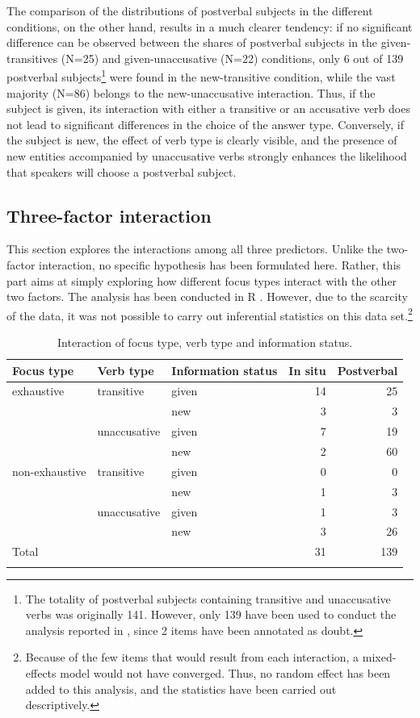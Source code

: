 The comparison of the distributions of postverbal subjects in the different conditions, on the other hand, results in a much clearer tendency: if no significant difference can be observed between the shares of postverbal subjects in the given-transitives (N=25) and given-unaccusative (N=22) conditions, only 6 out of 139 postverbal subjects\footnote{The totality of postverbal subjects containing transitive and unaccusative verbs was originally 141. However, only 139 have been used to conduct the analysis reported in , since 2 items have been annotated as doubt.} were found in the new-transitive condition, while the vast majority (N=86) belongs to the new-unaccusative interaction.
Thus, if the subject is given, its interaction with either a transitive or an accusative verb does not lead to significant differences in the choice of the answer type. Conversely, if the subject is new, the effect of verb type is clearly visible, and the presence of new entities accompanied by unaccusative verbs strongly enhances the likelihood that speakers will choose a postverbal subject.

\subsection{Three-factor interaction} \label{sub:6.7.2}
This section explores the interactions among all three predictors. Unlike the two-factor interaction, no specific hypothesis has been formulated here. Rather, this part aims at simply exploring how different focus types interact with the other two factors. The analysis has been conducted in R \parencite{rcoreteam19}. However, due to the scarcity of the data, it was not possible to carry out inferential statistics on this data set.\footnote{Because of the few items that would result from each interaction, a mixed-effects model would not have converged. Thus, no random effect has been added to this analysis, and the statistics have been carried out descriptively.}

\begin{table}
\begin{tabular}[t]{lllrr}
\lsptoprule
Focus type & Verb type & Information status & In situ & Postverbal\\
\midrule
exhaustive & transitive & given & 14 & 25\\
& & new &  3 & 3\\
& unaccusative & given & 7 & 19\\
& & new & 2 & 60\\
\midrule
non-exhaustive & transitive & given & 0 & 0\\
 & & new & 1 & 3\\
& unaccusative & given & 1 & 3\\
& & new & 3 & 26\\
\midrule
{Total} & & & 31 & 139\\
\lspbottomrule
\end{tabular}
\caption{
\label{tab:6.5}
Interaction of focus type, verb type and information status.}
\end{table}


